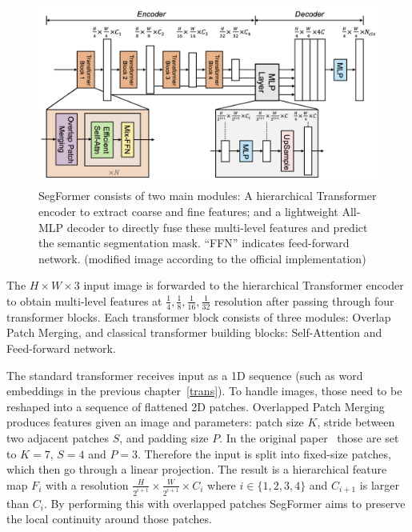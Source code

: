 \begin{figure}[h] %
    \centering
    \includegraphics[height=60mm]{figures/03_segformer_overview.png} %
    \caption{SegFormer consists of two main modules: A hierarchical Transformer encoder to extract coarse and fine features; and a lightweight All-MLP decoder to directly fuse these multi-level features and predict the semantic segmentation mask. “FFN” indicates feed-forward network. (modified image \cite{xie2021segformer} according to the official implementation)} %
    \label{fig:segformer_over} %
\end{figure} 

The $H\times W \times 3$ input image is forwarded to the hierarchical Transformer encoder to obtain multi-level features at $\frac{1}{4}, \frac{1}{8}, \frac{1}{16}, \frac{1}{32}$ resolution after passing through four transformer blocks.
Each transformer block consists of three modules: Overlap Patch Merging, and classical transformer building blocks: Self-Attention and Feed-forward network.

The standard transformer receives input as a 1D sequence (such as word embeddings in the previous chapter~\ref*{trans}).
To handle images, those need to be reshaped into a sequence of flattened 2D patches.
Overlapped Patch Merging produces features given an image and parameters: patch size $K$, stride between two adjacent patches $S$, and padding size $P$.
In the original paper~\cite{xie2021segformer} those are set to $K = 7$, $S = 4$ and $P = 3$.
Therefore the input is split into fixed-size patches, which then go through a linear projection.
The result is a hierarchical feature map $F_i$ with a
resolution $\frac{H}{2^{i+1}} \times \frac{W}{2^{i+1}} \times C_i$
where $i \in \{ 1,2,3,4\}$ and $C_{i+1}$ is larger than $C_i$.
By performing this with overlapped patches SegFormer aims to preserve the local continuity around those patches.


